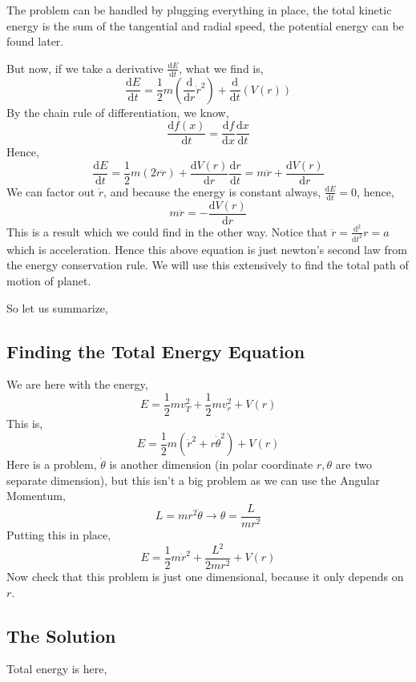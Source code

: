 \documentclass[11pt,a4paper]{article}
\begin{document}
The problem can be handled by plugging everything in place, the total kinetic energy is the sum of the tangential and radial speed, the potential energy can be found later. 

But now, if we take a derivative $ \frac{\mathrm{d} E}{\mathrm{d} t}$, what we find is,
\[ 
\frac{\mathrm{d} E}{\mathrm{d} t} =
\frac{1}{2}m \left( \frac{\mathrm{d} }{\mathrm{d} r} \dot{r}^2 \right) 
+ 
\frac{\mathrm{d} }{\mathrm{d} t} \left( V(r) \right) 
\]
By the chain rule of differentiation, we know,
\[ 
    \frac{\mathrm{d} f(x)}{\mathrm{d} t} = \frac{\mathrm{d} f}{\mathrm{d} x} \frac{\mathrm{d} x}{\mathrm{d} t}
\]
Hence,
\[ 
\frac{\mathrm{d} E}{\mathrm{d} t}=
\frac{1}{2} m 
\left( 2 \dot{ r} \ddot{ r } \right) + 
\frac{\mathrm{d} V(r)}{\mathrm{d} r} \frac{\mathrm{d} r}{\mathrm{d} t}
=
m \ddot{ r } + \frac{\mathrm{d} V(r)}{\mathrm{d} r}
\]
We can factor out $ \dot{r}$, and because the energy is constant always, $ \frac{\mathrm{d} E}{\mathrm{d} t} = 0$, hence,
\[ 
    m \ddot{ r } = - \frac{\mathrm{d} V(r)}{\mathrm{d} r}
\]
This is a result which we could find in the other way. Notice that $\ddot{ r }= \frac{\mathrm{d} ^2}{\mathrm{d} t^2}r= a$ which is acceleration. Hence this above equation is just newton's second law from the energy conservation rule. We will use this extensively to find the total path of motion of planet.

So let us summarize, 
\subsection{ Finding the Total Energy Equation }
We are here with the energy,
\[ 
    E = \frac{1}{2} m v_T ^2 + \frac{1}{2} m v_r ^2 + V(r)
\]
This is, 
\[ 
    E = \frac{1}{2} m \left( \dot{r}^2 + r \dot{\theta}^2 \right) + V(r)
\]
Here is a problem, $ \dot{\theta}$ is another dimension (in polar coordinate $r,\theta$ are two separate dimension), but this isn't a big problem as we can use the Angular Momentum,
\[ 
L = mr^2 \dot{\theta} \to \theta = \frac{L}{mr^2}
\]
Putting this in place,
\[ 
    E = \frac{1}{2} m \dot{r}^2 + \frac{L^2}{2mr^2} + V(r)
\]
Now check that this problem is just one dimensional, because it only depends on $r$.

\subsection{ The Solution }
Total energy is here,
\end{document}
